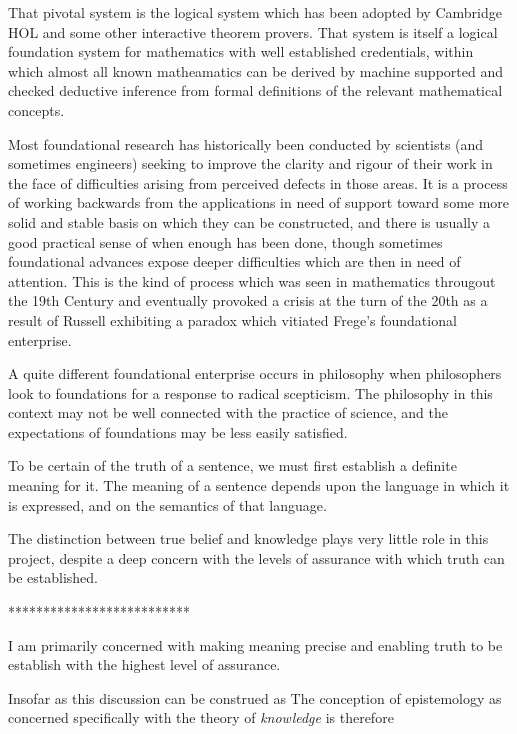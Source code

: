 \documentclass[10pt,titlepage]{book}
\begin{document}
That pivotal system is the logical system which has been adopted by Cambridge HOL and some other interactive theorem provers.
That system is itself a logical foundation system for mathematics with well established credentials, within which almost all known matheamatics can be derived by machine supported and checked deductive inference from formal definitions of the relevant mathematical concepts.

Most foundational research has historically been conducted by scientists (and sometimes engineers) seeking to improve the clarity and rigour of their work in the face of difficulties arising from perceived defects in those areas.
  It is a process of working backwards from the applications in need of support toward some more solid and stable basis on which they can be constructed, and there is usually a good practical sense of when enough has been done, though sometimes foundational advances expose deeper difficulties which are then in need of attention.
  This is the kind of process which was seen in mathematics througout the 19th Century and eventually provoked a crisis at the turn of the 20th as a result of Russell exhibiting a paradox which vitiated Frege's foundational enterprise.

  A quite different foundational enterprise occurs in philosophy when philosophers look to foundations for a response to radical scepticism.  The philosophy in this context may not be well connected with the practice of science, and the expectations of foundations may be less easily satisfied.

To be certain of the truth of a sentence, we must first establish a definite meaning for it.
The meaning of a sentence depends upon the language in which it is expressed, and on the semantics of that language.

The distinction between true belief and knowledge plays very little role in this project, despite a deep concern with the levels of assurance with which truth can be established.

**************************


I am primarily concerned with making meaning precise and enabling truth to be establish with the highest level of assurance.

Insofar as this discussion can be construed as 
The conception of epistemology as concerned specifically with the theory of \emph{knowledge} is therefore 
\end{document}
